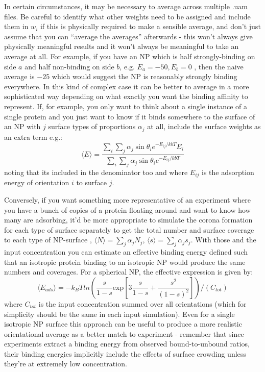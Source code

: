 \documentclass[10pt,a4paper,onecolumn]{report}
\begin{document}
In certain circumstances, it may be necessary to average across multiple .uam files. Be careful to identify what other weights need to be assigned and include them in $w_i$ if this is physically required to make a sensible average, and don't just assume that you can ``average the averages'' afterwards - this won't always give physically meaningful results and it won't always be meaningful to take an average at all. For example, if you have an NP which is half strongly-binding on side $a$ and half non-binding on side $b$, e.g. $E_a = -50, E_b = 0$ , then the naive average is $-25$ which would suggest the NP is reasonably strongly binding everywhere. In this kind of complex case it can be better to average in a more sophisticated way depending on what exactly you want the binding affinity to represent. If, for example, you only want to think about a single instance of a single protein and you just want to know if it binds somewhere to the surface of an NP with $j$ surface types of proportions $\alpha_j$ at all, include the surface weights as an extra term e.g.:
\begin{equation}
\langle E \rangle = \frac{ \sum_i \sum_j \alpha_j \sin \theta_i e^{-E_{ij}/kbT} E_i}{\sum_i \sum_j \alpha_j \sin \theta_i e^{-E_{ij}/kbT}}
\end{equation}
noting that its included in the denominator too and where $E_{ij}$ is the adsorption energy of orientation $i$ to surface $j$. 

Conversely, if you want something more representative of an experiment where you have a bunch of copies of a protein floating around and want to know how many are adsorbing, it'd be more appropriate to simulate the corona formation for each type of surface separately to get the total number and surface coverage to each type of NP-surface , $\langle N \rangle = \sum_j \alpha_j N_j$, $\langle s \rangle = \sum_j \alpha_j s_j$. With those and the input concentration you can estimate an effective binding energy defined such that an isotropic protein binding to an isotropic NP would produce the same numbers and coverages. For a spherical NP, the effective expression is given by:
\begin{equation}
\langle E_{ads} \rangle = -k_BT ln \left( \frac{s}{1-s} \mathrm{exp}[  3 \frac{s}{1-s} +\frac{ s^2}{  (1-s)^2} ]\right)/(C_{tot})
\end{equation}
where $C_{tot}$ is the input concentration summed over all orientations (which for simplicity should be the same in each input simulation). Even for a single isotropic NP surface this approach can be useful to produce a more realistic orientational average as a better match to experiment - remember that since experiments extract a binding energy from observed bound-to-unbound ratios, their binding energies implicitly include the effects of surface crowding unless they're at extremely low concentration.
 
\end{document}
